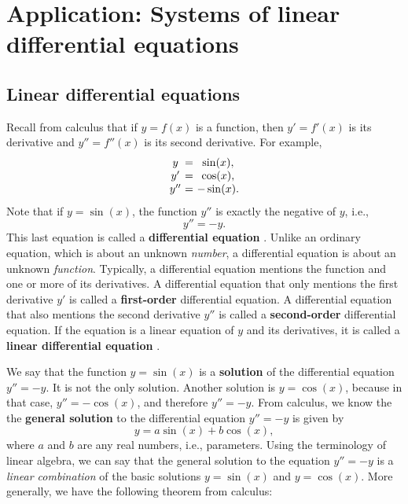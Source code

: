 \section{Application: Systems of linear differential equations}

\subsection{Linear differential equations}

Recall from calculus that if $y=f(x)$ is a function, then $y' = f'(x)$
is its derivative%
 and $y'' = f''(x)$ is its second derivative.  For
example,
\begin{equation*}
  \begin{array}{c@{~}c@{~}c}
    y &=& \sin(x),\\
    y' &=& \cos(x),\\
    y''&=& -\sin(x).\\
  \end{array}
\end{equation*}
Note that if $y=\sin(x)$, the function $y''$ is exactly the negative
of $y$, i.e.,
\begin{equation}
  y'' = -y.
\end{equation}
This last equation is called a \textbf{differential equation}%
%
. Unlike an ordinary equation, which is
about an unknown {\em number}, a differential equation is about an
unknown {\em function}. Typically, a differential equation mentions
the function and one or more of its derivatives. A differential
equation that only mentions the first derivative $y'$ is called a
\textbf{first-order}%
 differential equation. A
differential equation that also mentions the second derivative $y''$
is called a \textbf{second-order}%
 differential equation.
If the equation is a linear equation of $y$ and its derivatives, it is
called a \textbf{linear differential equation}%
%
.

We say that the function $y=\sin(x)$ is a \textbf{solution}%
 of the differential equation
$y'' = -y$. It is not the only solution. Another solution is
$y=\cos(x)$, because in that case, $y''=-\cos(x)$, and therefore
$y''=-y$. From calculus, we know the the \textbf{general solution} to
the differential equation $y'' = -y$ is given by
\begin{equation*}
  y = a\sin(x) + b\cos(x),
\end{equation*}
where $a$ and $b$ are any real numbers, i.e., parameters. Using the
terminology of linear algebra, we can say that the general solution to
the equation $y'' = -y$ is a {\em linear combination} of the basic
solutions $y=\sin(x)$ and $y=\cos(x)$. More generally, we have the
following theorem from calculus:

